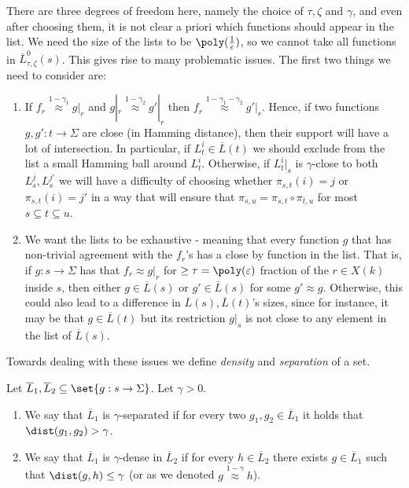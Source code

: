 There are three degrees of freedom here, namely the choice of \(\tau,\zeta\) and \(\gamma\), and even after choosing them, it is not clear a priori which functions should appear in the list. We need the size of the lists to be \(\poly(\frac{1}{\varepsilon})\), so we cannot take all functions in \(\overline{L}_{\tau,\zeta}^0 (s)\). This gives rise to many problematic issues. The first two things we need to consider are:
\begin{enumerate}
    \item If \(f_r \overset{1-\gamma_1}{\approx} g|_r\) and \(g|_r \overset{1-\gamma_2}{\approx} g'|_r\) then \(f_r \overset{1-\gamma_1-\gamma_2}{\approx} g'|_r\). Hence, if two functions \(g,g':t \to \Sigma\) are close (in Hamming distance), then their support will have a lot of intersection. In particular, if \(L_t^i \in \overline{L}(t)\) we should exclude from the list a small Hamming ball around \(L_t^i\). Otherwise, if \(L_t^i|_s\) is \(\gamma\)-close to both \(L_s^j,L_s^{j'}\) we will have a difficulty of choosing whether \(\pi_{s,t}(i)=j\) or \(\pi_{s,t}(i)=j'\) in a way that will ensure that \(\pi_{s,u} = \pi_{s,t} \circ \pi_{t,u}\) for most \(s \subseteq t \subseteq u\).
    \item We want the lists to be exhaustive - meaning that every function \(g\) that has non-trivial agreement with the \(f_r\)'s has a close by function in the list. That is, if \(g:s \to \Sigma\) has that \(f_r \approx g|_r\) for \(\geq \tau=\poly(\varepsilon)\) fraction of the \(r \in X(k)\) inside \(s\), then either \(g \in \overline{L}(s)\) or \(g' \in \bar{L}(s)\) for some \(g' \approx g\). Otherwise, this could also lead to a difference in \(\overline{L}(s),\overline{L}(t)\)'s sizes, since for instance, it may be that \(g \in \overline{L}(t)\) but its restriction \(g|_s\) is not close to any element in the list of \(\overline{L}(s)\).
\end{enumerate}
Towards dealing with these issues we define \emph{density} and \emph{separation} of a set.
\begin{definition}
    Let \(\overline{L}_1,\overline{L}_2 \subseteq \set{g:s \to \Sigma}\). Let \(\gamma > 0\).
    \begin{enumerate}
        \item We say that \(\overline{L}_1\) is \(\gamma\)-separated if for every two \(g_1,g_2 \in \overline{L}_1\) it holds that \(\dist(g_1,g_2) > \gamma\).
        \item We say that \(\overline{L}_1\) is \(\gamma\)-dense in \(\overline{L}_2\) if for every \(h \in \overline{L}_2\) there exists \(g \in \overline{L}_1\) such that \(\dist(g,h) \leq \gamma\) (or as we denoted \(g \overset{1-\gamma}{\approx} h\)).
    \end{enumerate}
\end{definition}
